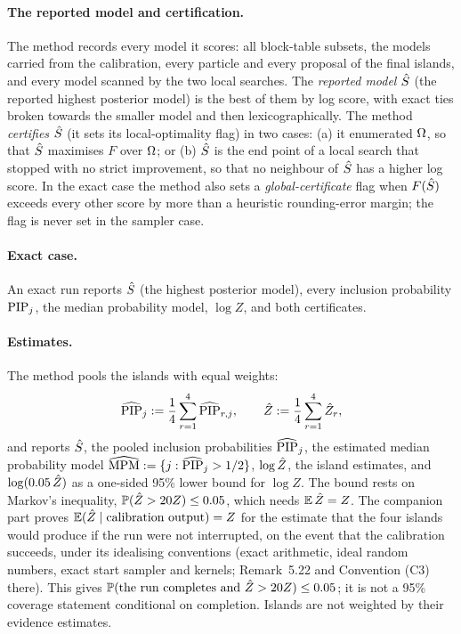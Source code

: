\documentclass[11pt]{article}
\begin{document}
\paragraph{The reported model and certification.} The method records every model it scores: all block-table subsets, the
models carried from the calibration, every particle and every proposal of the final islands, and every model scanned by
the two local searches. The \emph{reported model} $\hat S$ (the reported highest posterior model) is the best of them by
log score, with exact ties broken towards the smaller model and then lexicographically. The method \emph{certifies}
$\hat S$ (it sets its local-optimality flag) in two cases: (a) it enumerated $\Omega$, so that $\hat S$ maximises $F$ over
$\Omega$; or (b) $\hat S$ is the end point of a local search that stopped with no strict improvement, so that no neighbour of
$\hat S$ has a higher log score. In the exact case the method also sets a \emph{global-certificate} flag when $F(\hat S)$
exceeds every other score by more than a heuristic rounding-error margin; the flag is never set in the sampler case.

\paragraph{Exact case.} An exact run reports $\hat S$ (the highest posterior model), every inclusion probability
$\mathrm{PIP}_j$, the median probability model, $\log Z$, and both certificates.

\paragraph{Estimates.} The method pools the islands with equal weights:
\begin{equation}\label{eq:m-pool}
  \widehat{\mathrm{PIP}}_j:=\frac14\sum_{r=1}^4\widehat{\mathrm{PIP}}_{r,j},\qquad \hat Z:=\frac14\sum_{r=1}^4\hat Z_r,
\end{equation}
and reports $\hat S$, the pooled inclusion probabilities $\widehat{\mathrm{PIP}}_j$, the estimated median probability model
$\widehat{\mathrm{MPM}}:=\{j:\widehat{\mathrm{PIP}}_j>1/2\}$, $\log\hat Z$, the island estimates, and $\log(0.05\,\hat Z)$ as a one-sided 95\% lower bound
for $\log Z$. The bound rests on Markov's inequality, $\mathbb{P}(\hat Z>20Z)\le0.05$, which needs $\operatorname{\mathbb{E}}\hat Z=Z$. The companion part
proves $\operatorname{\mathbb{E}}(\hat Z\mid\text{calibration output})=Z$ for the estimate that the four islands would produce if the run were
not interrupted, on the event that the calibration succeeds, under its idealising conventions (exact arithmetic, ideal
random numbers, exact start sampler and kernels; Remark~5.22 and Convention (C3) there). This gives
$\mathbb{P}(\text{the run completes and }\hat Z>20Z)\le0.05$; it is not a 95\% coverage statement conditional on completion. Islands are not weighted by their evidence estimates.
\end{document}
